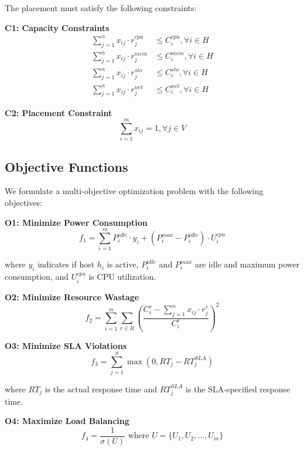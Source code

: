 \documentclass[10pt,conference]{IEEEtran}
\begin{document}
The placement must satisfy the following constraints:

\textbf{C1: Capacity Constraints}
\begin{align}
\sum_{j=1}^{n} x_{ij} \cdot r_j^{cpu} &\leq C_i^{cpu}, \forall i \in H \\
\sum_{j=1}^{n} x_{ij} \cdot r_j^{mem} &\leq C_i^{mem}, \forall i \in H \\
\sum_{j=1}^{n} x_{ij} \cdot r_j^{sto} &\leq C_i^{sto}, \forall i \in H \\
\sum_{j=1}^{n} x_{ij} \cdot r_j^{net} &\leq C_i^{net}, \forall i \in H
\end{align}

\textbf{C2: Placement Constraint}
\begin{equation}
\sum_{i=1}^{m} x_{ij} = 1, \forall j \in V
\end{equation}

\subsection{Objective Functions}

We formulate a multi-objective optimization problem with the following objectives:

\textbf{O1: Minimize Power Consumption}
\begin{equation}
f_1 = \sum_{i=1}^{m} P_i^{idle} \cdot y_i + (P_i^{max} - P_i^{idle}) \cdot U_i^{cpu}
\end{equation}

where $y_i$ indicates if host $h_i$ is active, $P_i^{idle}$ and $P_i^{max}$ are idle and maximum power consumption, and $U_i^{cpu}$ is CPU utilization.

\textbf{O2: Minimize Resource Wastage}
\begin{equation}
f_2 = \sum_{i=1}^{m} \sum_{r \in R} \left( \frac{C_i^r - \sum_{j=1}^{n} x_{ij} \cdot r_j^r}{C_i^r} \right)^2
\end{equation}

\textbf{O3: Minimize SLA Violations}
\begin{equation}
f_3 = \sum_{j=1}^{n} \max(0, RT_j - RT_j^{SLA})
\end{equation}

where $RT_j$ is the actual response time and $RT_j^{SLA}$ is the SLA-specified response time.

\textbf{O4: Maximize Load Balancing}
\begin{equation}
f_4 = \frac{1}{\sigma(U)} \text{ where } U = \{U_1, U_2, ..., U_m\}
\end{equation}
\end{document}
